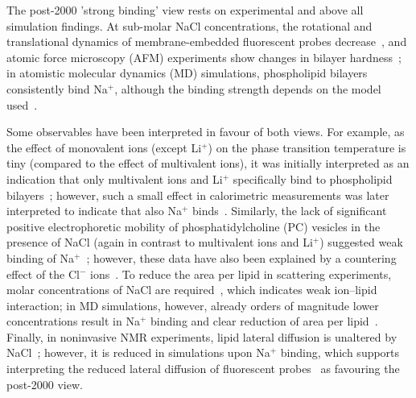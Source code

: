 \documentclass[twoside,twocolumn,9pt]{article}
\begin{document}
The post-2000 'strong binding' view rests on experimental and above all simulation findings.
At sub-molar NaCl concentrations, the rotational and translational dynamics of membrane-embedded fluorescent probes decrease~\cite{bockmann03,vacha09a,harb13}, and atomic force microscopy (AFM) experiments show changes in bilayer hardness~\cite{manyes05,manyes06,fukuma07,ferber11,morata12};
in atomistic molecular dynamics (MD) simulations, phospholipid bilayers consistently bind Na${^+}$,
although the binding strength depends on the model used~\cite{bockmann03,bockmann04,sachs04,berkowitz06,cordomi08,cordomi09,valley11,berkowitz12}.

Some observables have been interpreted in favour of both views. For example,
as the effect of monovalent ions (except Li$^+$)  on the phase transition temperature is tiny
(compared to the effect of multivalent ions), it was initially interpreted 
as an indication that only multivalent ions and Li$^+$ specifically bind to phospholipid bilayers~\cite{cevc90}; 
however, such a small effect in calorimetric measurements was later interpreted to indicate that also
Na$^+$ binds~\cite{bockmann03,klasczyk10}.
Similarly, the lack of significant positive electrophoretic mobility
of phosphatidylcholine (PC) vesicles in the presence of NaCl
(again in contrast to multivalent ions and Li$^+$)
suggested weak binding of Na$^+$~\cite{eisenberg79,tatulian87,manyes05,manyes06,klasczyk10};
however, these data have also been explained by a countering effect of the Cl$^-$ ions~\cite{berkowitz06,knecht13}.
To reduce the area per lipid in scattering experiments, molar concentrations of NaCl are required~\cite{pabst07}, which indicates weak ion--lipid interaction;
in MD simulations, however, already orders of magnitude lower concentrations result in Na$^+$ binding and clear reduction of area per lipid~\cite{bockmann03,cordomi08}.
Finally,  in noninvasive NMR experiments, lipid lateral diffusion is unaltered by NaCl~\cite{filippov09};
however, it is reduced in simulations upon Na$^+$ binding,
which supports interpreting the reduced lateral diffusion of fluorescent probes~\cite{bockmann03,vacha09a,harb13}
as favouring the post-2000 view.
\end{document}
